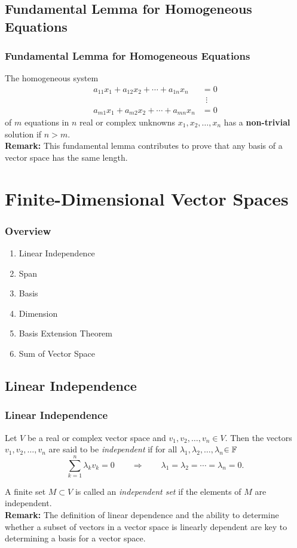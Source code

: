 \documentclass[12pt, t]{beamer}
\renewcommand{\emph}[1]{{\color{Turquoise3}\textsl{#1}}}
\newcommand{\myseries}[2]{$#1_1,#1_2,\dots,#1_#2$}
\newcommand{\nullspace}{~\\[15pt]}
\newcommand{\remark}{\textbf{Remark: }}
\begin{document}
\subsection{Fundamental Lemma for Homogeneous Equations}
\begin{frame}
    \frametitle{Fundamental Lemma for Homogeneous Equations}
    The homogeneous system
    \begin{align*}
        a_{11}x_1+a_{12}x_2+\cdots+a_{1n}x_n & =0       \\
                                             & ~~\vdots \\
        a_{m1}x_1+a_{m2}x_2+\cdots+a_{mn}x_n & =0
    \end{align*}
    of $m$ equations in $n$ real or complex unknowns \myseries{x}{n} has a \textbf{non-trivial} solution if $n>m$.\\[15pt]

    \textbf{Remark:} This fundamental lemma contributes to prove that any basis of a vector space has the same length.

\end{frame}

\section{Finite-Dimensional Vector Spaces}

\begin{frame}
    \frametitle{Overview}
    \begin{enumerate}
        \item Linear Independence
        \item Span
        \item Basis
        \item Dimension
        \item Basis Extension Theorem
        \item Sum of Vector Space
    \end{enumerate}
\end{frame}

\subsection{Linear Independence}
\begin{frame}
    \frametitle{Linear Independence}
    Let $V$ be a real or complex vector space and \myseries{v}{n}$\in V$. Then the vectors \myseries{v}{n} are said to be \emph{independent} if for all \myseries{\lambda}{n}$\in\mathbb{F}$ \vspace*{-4mm}
    \[\sum_{k=1}^{n}\lambda_kv_k=0\qquad\Rightarrow\qquad\lambda_1=\lambda_2=\cdots=\lambda_n=0.\]

    A finite set $M\subset V$ is called an \emph{independent set} if the elements of $M$ are independent.
    \nullspace
    \remark The definition of linear dependence and the ability to determine whether a subset of vectors in a vector space is linearly dependent are key to determining a basis for a vector space.
\end{frame}
\end{document}
